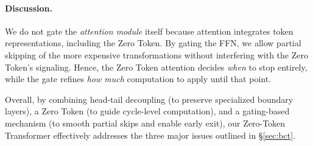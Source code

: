 \paragraph{Discussion.}
We do not gate the \emph{attention module} itself because attention integrates token representations, including the Zero Token. 
By gating the FFN, we allow partial skipping of the more expensive transformations without interfering with the Zero Token’s signaling. 
Hence, the Zero Token attention decides \emph{when} to stop entirely, while the gate refines \emph{how much} computation to apply until that point.

Overall, by combining head-tail decoupling (to preserve specialized boundary layers), a Zero Token (to guide cycle-level computation), and a gating-based mechanism (to smooth partial skips and enable early exit), our Zero-Token Transformer effectively addresses the three major issues outlined in \S\ref{sec:bct}.
